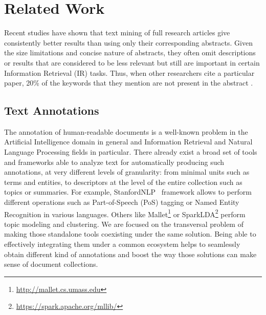 

\chapter{Related Work}\label{ch:soa}

\graphicspath{{soa/figures/}}


Recent studies \cite{Westergaard2017}\cite{Sciences2016} have shown that text mining of full research articles give consistently better results than using only their corresponding abstracts. Given the size limitations and concise nature of abstracts, they often omit descriptions or results that are considered to be less relevant but still are important in certain Information Retrieval (IR) tasks. Thus, when other researchers cite a particular paper, 20\% of the keywords that they mention are not present in the abstract \cite{Divoli2012}.



\section{Text Annotations}

The annotation of human-readable documents is a well-known problem in the Artificial Intelligence domain in general and Information Retrieval and Natural Language Processing fields in particular. There already exist a broad set of tools and frameworks able to analyze text for automatically producing such annotations, at very different levels of granularity: from minimal units such as terms and entities, to descriptors at the level of the entire collection such as  topics or summaries. For example, StanfordNLP~\cite{Manning2014TheToolkit} framework allows to perform different operations such as Part-of-Speech (PoS) tagging or Named Entity Recognition in various languages. Others like Mallet\footnote{\url{http://mallet.cs.umass.edu}} or SparkLDA\footnote{\url{https://spark.apache.org/mllib/}} perform topic modeling and clustering. We are focused on the transversal problem of making those standalone tools coexisting under the same solution. Being able to effectively integrating  them  under a common ecosystem helps to seamlessly obtain different kind of  annotations and boost the way those solutions can make sense of document collections.  
 
